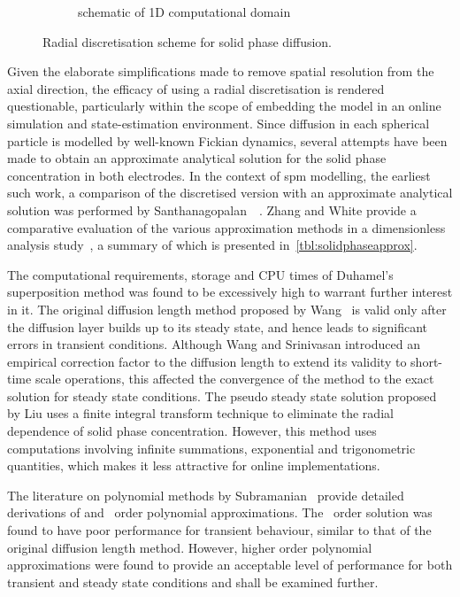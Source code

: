 \begin{figure}[!htbp]
\begin{subfigure}[b]{0.3\textwidth}
        \caption{schematic of 1D computational domain}
        \label{subfig:radialdisc1d}
    \end{subfigure}
    \caption{Radial discretisation scheme for solid phase diffusion.}
    \label{fig:radialdiscretisation}
\end{figure}

Given  the elaborate  simplifications  made to  remove  spatial resolution  from
the  axial  direction,  the  efficacy   of  using  a  radial  discretisation  is
rendered  questionable, particularly  within the  scope of  embedding the  model
in  an  online  simulation  and state-estimation  environment.  Since  diffusion
in  each  spherical  particle  is   modelled  by  well-known  Fickian  dynamics,
several attempts  have been  made to obtain  an approximate  analytical solution
for  the  solid phase  concentration  in  both  electrodes.  In the  context  of
\gls{spm}  modelling,  the  earliest  such  work,  \ie{}  a  comparison  of  the
discretised  version  with  an  approximate analytical  solution  was  performed
by  Santhanagopalan~\etal~\cite{Santhanagopalan2006}.  Zhang and  White  provide
a   comparative  evaluation   of  the   various  approximation   methods  in   a
dimensionless analysis  study~\cite{Zhang2007}, a summary of  which is presented
in~\cref{tbl:solidphaseapprox}.



The  computational  requirements, \viz{}  storage  and  CPU times  of  Duhamel's
superposition  method  was found  to  be  excessively  high to  warrant  further
interest in it. The original diffusion length method proposed by Wang~\etal{} is
valid  only  after the  diffusion  layer  builds up  to  its  steady state,  and
hence leads  to significant  errors in transient  conditions. Although  Wang and
Srinivasan introduced  an empirical  correction factor  to the  diffusion length
to  extend  its validity  to  short-time  scale  operations, this  affected  the
convergence of the method to the exact solution for steady state conditions. The
pseudo steady  state solution proposed by  Liu uses a finite  integral transform
technique  to eliminate  the  radial dependence  of  solid phase  concentration.
However,   this  method   uses  computations   involving  infinite   summations,
exponential and  trigonometric quantities,  which makes  it less  attractive for
online implementations.

The   literature   on   polynomial  methods   by   Subramanian~\etal{}   provide
detailed derivations  of  and  ~order polynomial
approximations.  The  ~order solution  was  found  to have  poor
performance for transient  behaviour, similar to that of  the original diffusion
length method.  However, higher  order polynomial  approximations were  found to
provide an acceptable  level of performance for both transient  and steady state
conditions and shall be examined further.

